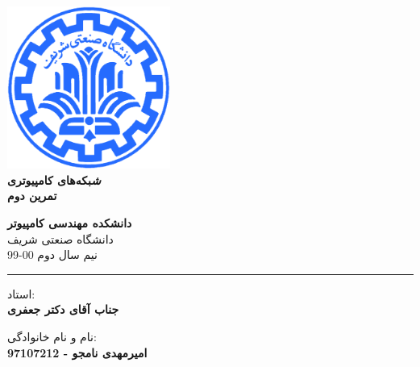 \documentclass[12pt]{article}
\begin{document}
	
	
	\begin{titlepage}
		\begin{center}
			
			\vspace*{0.7cm}
			
			\includegraphics[width=0.4\textwidth]{sharif1.png}\\
			\vspace{0.5cm}
			\textbf{ \Huge{\emph  ﺷﺒﻜﻪ‌های کامپیوتری} }\\
			\vspace{0.5cm}
			\textbf{ \Large{ تمرین دوم} }
			\vspace{0.2cm}
			
			
			\large \textbf{دانشکده مهندسی کامپیوتر}\\\vspace{0.2cm}
			\large   دانشگاه صنعتی شریف\\\vspace{0.2cm}
			\large   ﻧﯿﻢ سال دوم 00-99 \\\vspace{0.2cm}
			\noindent\rule[1ex]{\linewidth}{1pt}
			استاد:\\
			\textbf{{جناب آقای دکتر جعفری}}
			
			
			\vspace{0.15cm}
			نام و نام خانوادگی:\\
			
			
			\textbf{{امیرمهدی نامجو - 97107212}}
		\end{center}
	\end{titlepage}
	
	
	\newpage
	\pagestyle{fancy}
	\fancyhf{}
	\fancyfoot{}
	\cfoot{\thepage}
	
\end{document}
